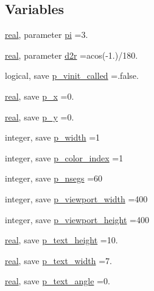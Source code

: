 \subsection*{Variables}
\begin{DoxyCompactItemize}
\item 
\hyperlink{read__watch_83_8txt_abdb62bde002f38ef75f810d3a905a823}{real}, parameter \hyperlink{namespacem__pixel_a2ff737e84d07f927bac2deb1801428a2}{pi} =3.
\item 
\hyperlink{read__watch_83_8txt_abdb62bde002f38ef75f810d3a905a823}{real}, parameter \hyperlink{namespacem__pixel_a452fdfdc5c2570a301103fcb181cfb7d}{d2r} =acos(-\/1.)/180.
\item 
logical, save \hyperlink{namespacem__pixel_a5205a23825feacbc005215adc889a710}{p\+\_\+vinit\+\_\+called} =.false.
\item 
\hyperlink{read__watch_83_8txt_abdb62bde002f38ef75f810d3a905a823}{real}, save \hyperlink{namespacem__pixel_a983dc4bc4ea45266ee8b5100367bedee}{p\+\_\+x} =0.
\item 
\hyperlink{read__watch_83_8txt_abdb62bde002f38ef75f810d3a905a823}{real}, save \hyperlink{namespacem__pixel_a8bda60db9b6c7c2402e1e12a44bc36aa}{p\+\_\+y} =0.
\item 
integer, save \hyperlink{namespacem__pixel_a0ccc9f9102afdf3b469b3d2cab22aec9}{p\+\_\+width} =1
\item 
integer, save \hyperlink{namespacem__pixel_af37b7b3481f3876270e99200e2554b9f}{p\+\_\+color\+\_\+index} =1
\item 
integer, save \hyperlink{namespacem__pixel_ace7c28c9ae8a890cac3c7fc2d3c2e824}{p\+\_\+nsegs} =60
\item 
integer, save \hyperlink{namespacem__pixel_adaf071a7cca5f7d4404d59c17739fcf3}{p\+\_\+viewport\+\_\+width} =400
\item 
integer, save \hyperlink{namespacem__pixel_acf14b658781bda49f8d06960898145e1}{p\+\_\+viewport\+\_\+height} =400
\item 
\hyperlink{read__watch_83_8txt_abdb62bde002f38ef75f810d3a905a823}{real}, save \hyperlink{namespacem__pixel_a537c6094f5f61e3244c7e380824f303e}{p\+\_\+text\+\_\+height} =10.
\item 
\hyperlink{read__watch_83_8txt_abdb62bde002f38ef75f810d3a905a823}{real}, save \hyperlink{namespacem__pixel_adc146e2cd2855f33422e2c11ca1ba7ce}{p\+\_\+text\+\_\+width} =7.
\item 
\hyperlink{read__watch_83_8txt_abdb62bde002f38ef75f810d3a905a823}{real}, save \hyperlink{namespacem__pixel_a3b1c231e0814986c5d095cbd4297c816}{p\+\_\+text\+\_\+angle} =0.

\end{DoxyCompactItemize}
